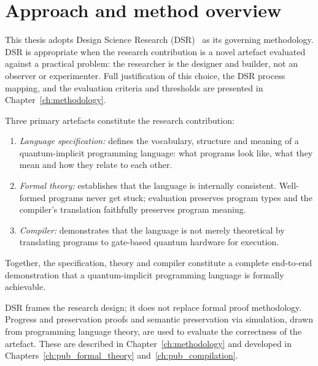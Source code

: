 \section{Approach and method overview}\label{sec:introduction:approach}

This thesis adopts Design Science Research (DSR)~\cite{Hevner2004DesignScienceIS,Peffers2007DSRM} as its governing methodology.
DSR is appropriate when the research contribution is a novel artefact evaluated against a practical problem: the researcher is the designer and builder, not an observer or experimenter.
Full justification of this choice, the DSR process mapping, and the evaluation criteria and thresholds are presented in Chapter~\ref{ch:methodology}.

Three primary artefacts constitute the research contribution:
\begin{enumerate}
    \item \textit{Language specification:} defines the vocabulary, structure and meaning of a quantum-implicit programming language: what programs look like, what they mean and how they relate to each other.
    \item \textit{Formal theory:} establishes that the language is internally consistent.
    Well-formed programs never get stuck; evaluation preserves program types and the compiler's translation faithfully preserves program meaning.
    \item \textit{Compiler:} demonstrates that the language is not merely theoretical by translating programs to gate-based quantum hardware for execution.
\end{enumerate}

Together, the specification, theory and compiler constitute a complete end-to-end demonstration that a quantum-implicit programming language is formally achievable.

DSR frames the research design; it does not replace formal proof methodology.
Progress and preservation proofs and semantic preservation via simulation, drawn from programming language theory, are used to evaluate the correctness of the artefact.
These are described in Chapter~\ref{ch:methodology} and developed in Chapters~\ref{ch:pub_formal_theory} and~\ref{ch:pub_compilation}.